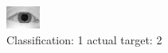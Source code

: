 \begin{figure}[h!]
\begin{center}
\includegraphics[width=0.60\columnwidth]{figures/ID883_class_1_target_2.png}
\end{center}
\caption{ Classification: 1 actual target: 2}
\label{fig:ID883_class_1_target_2}
\end{figure}
